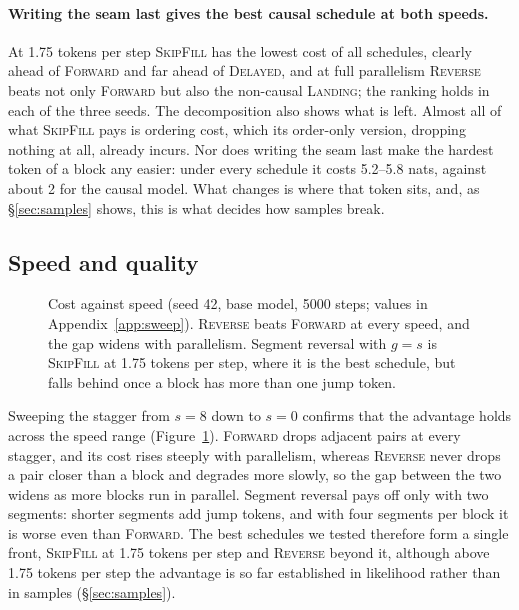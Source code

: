 \documentclass{article}
\theoremstyle{definition}
\theoremstyle{remark}
\newcommand{\name}[1]{\textup{\textsc{#1}}}
\newcommand{\sfill}{\name{SkipFill}\xspace}
\newcommand{\rev}{\name{Reverse}\xspace}
\newcommand{\fwd}{\name{Forward}\xspace}
\newcommand{\delayed}{\name{Delayed}\xspace}
\newcommand{\landing}{\name{Landing}\xspace}
\begin{document}
\paragraph{Writing the seam last gives the best causal schedule at both speeds.}
At 1.75 tokens per step \sfill has the lowest cost of all schedules, clearly ahead of \fwd and far ahead of \delayed, and at full parallelism \rev beats not only \fwd but also the non-causal \landing; the ranking holds in each of the three seeds.
The decomposition also shows what is left.
Almost all of what \sfill pays is ordering cost, which its order-only version, dropping nothing at all, already incurs.
Nor does writing the seam last make the hardest token of a block any easier: under every schedule it costs 5.2--5.8 nats, against about 2 for the causal model.
What changes is where that token sits, and, as \S\ref{sec:samples} shows, this is what decides how samples break.

\subsection{Speed and quality}
\label{sec:tradeoff}

\begin{figure}[t]
  \centering
  
  \caption{Cost against speed (seed 42, base model, 5000 steps; values in Appendix~\ref{app:sweep}). \rev beats \fwd at every speed, and the gap widens with parallelism. Segment reversal with $g=s$ is \sfill at 1.75 tokens per step, where it is the best schedule, but falls behind once a block has more than one jump token.}
  \label{fig:tradeoff}
\end{figure}

Sweeping the stagger from $s=8$ down to $s=0$ confirms that the advantage holds across the speed range (Figure~\ref{fig:tradeoff}).
\fwd drops adjacent pairs at every stagger, and its cost rises steeply with parallelism, whereas \rev never drops a pair closer than a block and degrades more slowly, so the gap between the two widens as more blocks run in parallel.
Segment reversal pays off only with two segments: shorter segments add jump tokens, and with four segments per block it is worse even than \fwd.
The best schedules we tested therefore form a single front, \sfill at 1.75 tokens per step and \rev beyond it, although above 1.75 tokens per step the advantage is so far established in likelihood rather than in samples (\S\ref{sec:samples}).

\end{document}
